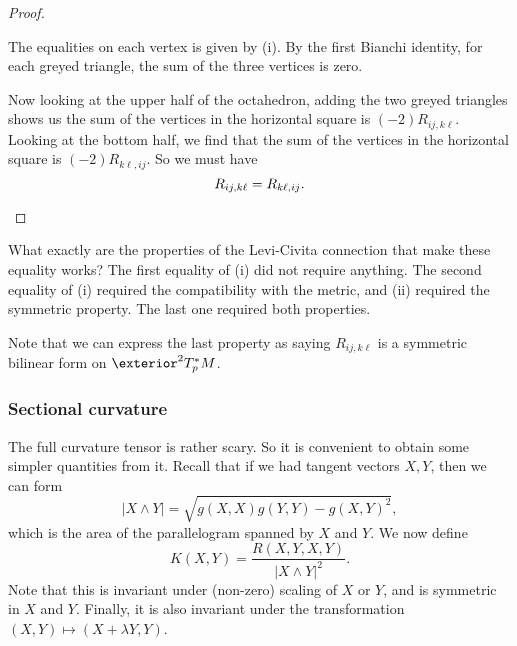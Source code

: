 \documentclass[a4paper]{article}
\begin{document}
\begin{proof}
\begin{enumerate}
\begin{center}
      \end{center}
      The equalities on each vertex is given by (i). By the first Bianchi identity, for each greyed triangle, the sum of the three vertices is zero.

      Now looking at the upper half of the octahedron, adding the two greyed triangles shows us the sum of the vertices in the horizontal square is $(-2) R_{ij, k\ell}$. Looking at the bottom half, we find that the sum of the vertices in the horizontal square is $(-2)R_{k\ell, ij}$. So we must have
      \[
        R_{ij, k\ell} = R_{k\ell, ij}.\qedhere
      \]
  \end{enumerate}
\end{proof}
What exactly are the properties of the Levi-Civita connection that make these equality works? The first equality of (i) did not require anything. The second equality of (i) required the compatibility with the metric, and (ii) required the symmetric property. The last one required both properties.

Note that we can express the last property as saying $R_{ij, k\ell}$ is a symmetric bilinear form on $\exterior^2 T_p^*M$.

\subsubsection*{Sectional curvature}
The full curvature tensor is rather scary. So it is convenient to obtain some simpler quantities from it. Recall that if we had tangent vectors $X, Y$, then we can form
\[
  |X \wedge Y| = \sqrt{g(X, X)g(Y, Y) - g(X, Y)^2},
\]
which is the area of the parallelogram spanned by $X$ and $Y$. We now define
\[
  K(X, Y) = \frac{R(X, Y, X, Y)}{|X \wedge Y|^2}.
\]
Note that this is invariant under (non-zero) scaling of $X$ or $Y$, and is symmetric in $X$ and $Y$. Finally, it is also invariant under the transformation $(X, Y) \mapsto (X + \lambda Y, Y)$.
\end{document}
